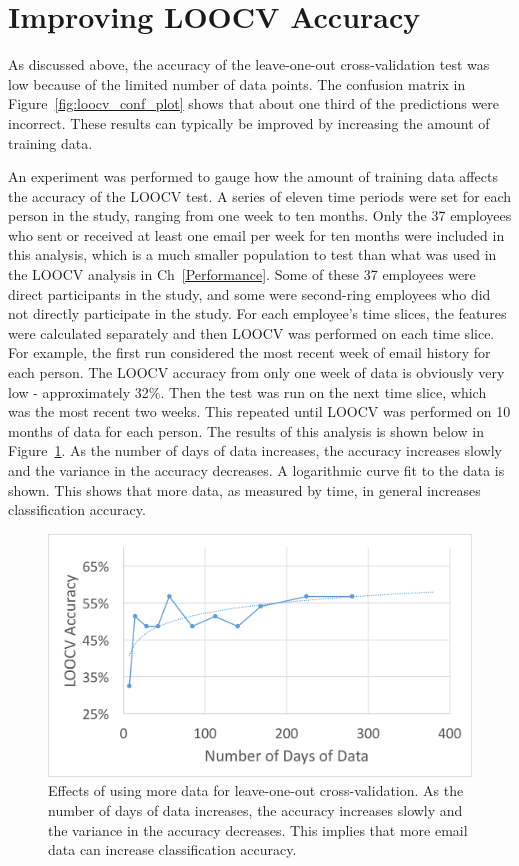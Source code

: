 \documentclass[12pt]{report}
\begin{document}
\section{Improving LOOCV Accuracy}
As discussed above, the accuracy of the leave-one-out cross-validation test was low because of the limited number of data points.
The confusion matrix in Figure~\ref{fig:loocv_conf_plot} shows that about one third of the predictions were incorrect.  
These results can typically be improved by increasing the amount of training data. 

An experiment was performed to gauge how the amount of training data affects the accuracy of the LOOCV test.
A series of eleven time periods were set for each person in the study, ranging from one week to ten months.
Only the 37 employees who sent or received at least one email per week for ten months were included in this analysis, which is a much smaller population to test than what was used in the LOOCV analysis in Ch~\ref{Performance}.
Some of these 37 employees were direct participants in the study, and some were second-ring employees who did not directly participate in the study.
For each employee's time slices, the features were calculated separately and then LOOCV was performed on each time slice.
For example, the first run considered the most recent week of email history for each person.
The LOOCV accuracy from only one week of data is obviously very low - approximately 32\%.
Then the test was run on the next time slice, which was the most recent two weeks.
This repeated until LOOCV was performed on 10 months of data for each person.
The results of this analysis is shown below in Figure~\ref{fig:loocv_generalization}.
As the number of days of data increases, the accuracy increases slowly and the variance in the accuracy decreases.
A logarithmic curve fit to the data is shown.
This shows that more data, as measured by time, in general increases classification accuracy.
\begin{figure}[t]
    \centering
        \includegraphics[width=.7\columnwidth,trim={0mm 0mm 0mm 0mm},clip]{num_days_LOOCV}
        \vspace{-7pt}
        \caption[Effects of more data on prediction accuracy]{Effects of using more data for leave-one-out cross-validation.  As the number of days of data increases, the accuracy increases slowly and the variance in the accuracy decreases.  This implies that more email data can increase classification accuracy.}
        \label{fig:loocv_generalization}
\end{figure}
\end{document}
